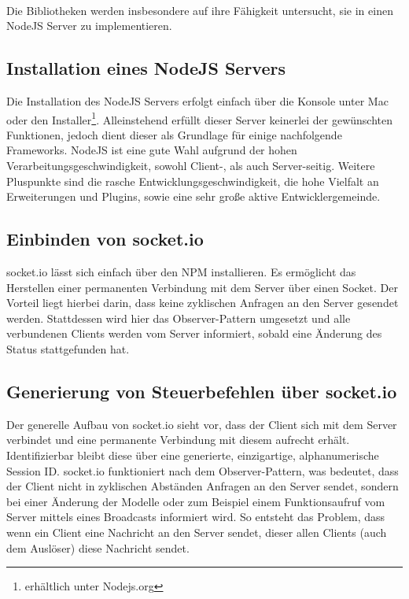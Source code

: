 \\Die Bibliotheken werden insbesondere auf ihre Fähigkeit untersucht, sie in einen \gls{NodeJS} Server zu implementieren.

	\subsection{Installation eines \gls{NodeJS} Servers}
	Die Installation des \gls{NodeJS} Servers erfolgt einfach über die Konsole unter Mac oder den Installer\footnote{erhältlich unter Nodejs.org}. Alleinstehend erfüllt dieser Server keinerlei der gewünschten Funktionen, jedoch dient dieser als Grundlage für einige nachfolgende \Gls{Framework}s. \gls{NodeJS} ist eine gute Wahl aufgrund der hohen Verarbeitungsgeschwindigkeit, sowohl Client-, als auch Server-seitig. Weitere Pluspunkte sind die rasche Entwicklungsgeschwindigkeit, die hohe Vielfalt an Erweiterungen und Plugins, sowie eine sehr große aktive Entwicklergemeinde.
	\subsection{Einbinden von socket.io}
	socket.io lässt sich einfach über den \Gls{NPM} installieren. Es ermöglicht das Herstellen einer permanenten Verbindung mit dem Server über einen Socket. Der Vorteil liegt hierbei darin, dass keine zyklischen Anfragen an den Server gesendet werden. Stattdessen wird hier das Observer-Pattern umgesetzt und alle verbundenen Clients werden vom Server informiert, sobald eine Änderung des Status stattgefunden hat. 
	
	\subsection{Generierung von Steuerbefehlen über socket.io}
	Der generelle Aufbau von socket.io sieht vor, dass der Client sich mit dem Server verbindet und eine permanente Verbindung mit diesem aufrecht erhält. Identifizierbar bleibt diese über eine generierte, einzigartige, alphanumerische Session ID. socket.io funktioniert nach dem Observer-Pattern, was bedeutet, dass der Client nicht in zyklischen Abständen Anfragen an den Server sendet, sondern bei einer Änderung der Modelle oder zum Beispiel einem Funktionsaufruf vom Server mittels eines Broadcasts informiert wird. So entsteht das Problem, dass wenn ein Client eine Nachricht an den Server sendet, dieser allen Clients (auch dem Auslöser) diese Nachricht sendet. 
	
	

